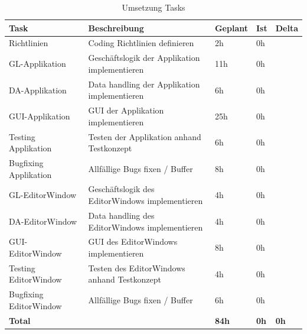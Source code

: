   \begin{table}[H]
    \centering
    \settowidth{}
    \setlength\extrarowheight{2pt}
    \begin{tabulary}{1.0\textwidth}{|L|L|L|L|L|}
      \hline
      \textbf{Task} &
      \textbf{Beschreibung} &
      \textbf{Geplant}&
      \textbf{Ist}&
      \textbf{Delta}\\
      \hline
      Richtlinien &
      Coding Richtlinien definieren &
      2h &
      0h &
      \\
      \hline
      GL-Applikation &
      Geschäftslogik der Applikation implementieren &
      11h &
      0h &
      \\
      \hline
      DA-Applikation &
      Data handling der Applikation implementieren&
      6h &
      0h &
      \\
      \hline
      GUI-Applikation &
      GUI der Applikation implementieren &
      25h &
      0h &
      \\
      \hline
      Testing Applikation &
      Testen der Applikation anhand Testkonzept &
      6h &
      0h &
      \\
      \hline
      Bugfixing Applikation &
      Allfällige Bugs fixen / Buffer &
      8h &
      0h &
      \\
      \hline
      GL-EditorWindow &
      Geschäftslogik des EditorWindows implementieren &
      4h &
      0h &
      \\
      \hline
      DA-EditorWindow&
      Data handling des EditorWindows implementieren &
      4h &
      0h &
      \\
      \hline
      GUI-EditorWindow &
      GUI des EditorWindows implementieren &
      8h &
      0h &
      \\
      \hline
      Testing EditorWindow &
      Testen des EditorWindows anhand Testkonzept &
      4h &
      0h &
      \\
      \hline
      Bugfixing EditorWindow &
      Allfällige Bugs fixen / Buffer &
      6h &
      0h &
      \\
      \hline
      \textbf{Total} &
       &
      \textbf{84h} &
      \textbf{0h} &
      \textbf{0h} \\
      \hline
    \end{tabulary}
    \caption{Umsetzung Tasks}
  \end{table}

